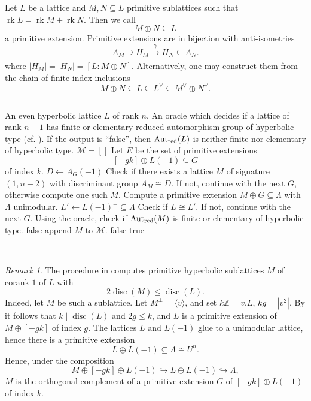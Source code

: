 \documentclass[11pt,letterpaper]{amsart}
\DeclareMathOperator{\rk}{rk}
\DeclareMathOperator{\Aut}{Aut}
\DeclareMathOperator{\disc}{disc}
\newcommand{\ZZ}{\mathbb{Z}}
\newcommand{\AutredL}{\Aut_{\rm red}(L)}
\newcommand{\AutredM}{\Aut_{\rm red}(M)}
\theoremstyle{definition}
\theoremstyle{remark}
\newtheorem{remark}[theorem]{Remark}
\begin{document}
Let $L$ be a lattice and $M,N \subseteq L$ primitive sublattices such that $\rk L = \rk M+ \rk N$. 
Then we call 
\[M\oplus N \subseteq L\]
a primitive extension. Primitive extensions are in bijection with anti-isometries
\[A_M \supseteq H_M \xrightarrow[]{\gamma} H_N \subseteq A_N.\]
where $|H_M|=|H_N|=[L:M \oplus N]$.
Alternatively, one may construct them from the chain of finite-index inclusions 
\[M\oplus N \subseteq L \subseteq L^\vee \subseteq M^\vee \oplus N^\vee.\]
\begingroup
{}\label{alg:sublattice}
\endgroup
\hrule
\begin{algorithmic}[1]
\REQUIRE An even hyperbolic lattice $L$ of rank $n$. An oracle which decides if a lattice of rank $n-1$ has finite or elementary reduced automorphism group of hyperbolic type (cf. ). 
\ENSURE If the output is ``false'', then $\AutredL$ is neither finite nor elementary of hyperbolic type.
 \STATE $\mathcal{M} = []$
 \FOR{$k \mid \disc(L)$}
   \STATE Let $E$ be the set of primitive extensions
   \[[-gk]\oplus L(-1) \subseteq G\] 
   of index $k$.
     \STATE $D \gets A_G(-1)$
     \STATE Check if there exists a lattice $M$ of signature $(1,n-2)$ with discriminant group $A_M \cong D$. If not, continue with the next $G$, otherwise compute one such $M$.
     \STATE Compute a primitive extension $M \oplus G \subseteq \Lambda$ with $\Lambda$ unimodular.
     \STATE $L' \gets L(-1)^\perp \subseteq \Lambda$
     \STATE Check if $L \cong L'$. If not, continue with the next $G$.  
     \STATE Using the oracle, check if $\AutredM$ is finite or elementary of hyperbolic type. 
     \IF{$\AutredM$ is not finite or hyperbolic}
       \RETURN false \label{line:not finite or hyperbolic}
     \ENDIF
     \label{line:M-represents-0-2}
         \STATE append $M$ to $\mathcal{M}$.
     \ENDIF
         \RETURN false \label{line:two-test}
       \ENDIF
    \ENDIF
    \ENDFOR
  \ENDFOR
\ENDFOR
\RETURN true
\end{algorithmic}\hrulefill\\
\begin{remark}\label{rem.explain_sublattice_test}
The procedure in  computes primitive  hyperbolic sublattices $M$ of corank $1$ of $L$ with \[2\disc(M)\le \disc(L).\] Indeed, let $M$ be such a sublattice. Let $M^\perp = \langle v \rangle$, and set $k\ZZ = v.L$, $kg = |v^2|$. By  it follows that $k\mid \disc(L)$ and $2g \le k$, and $L$ is a primitive extension of $M\oplus [ -gk]$ of index $g$. The lattices $L$ and $L(-1)$ glue to a unimodular lattice, hence there is a primitive extension 
\[L \oplus L(-1) \subseteq \Lambda \cong U^{n}.\] 
Hence, under the composition \[ M \oplus [-gk] \oplus L(-1) \hookrightarrow L \oplus L(-1)\hookrightarrow \Lambda,\] $M$ is the orthogonal complement of a primitive extension $G$ of $[-gk]\oplus L(-1)$ of index $k$. 
\end{remark}
\end{document}
